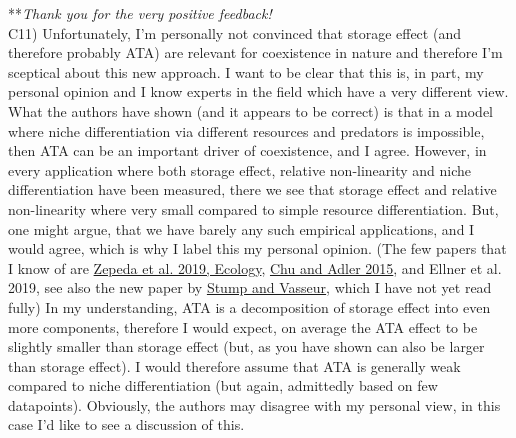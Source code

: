 \documentclass[letterpaper,11pt]{article}
\begin{document}
\noindent ***\emph{Thank you for the very positive feedback!} \\

\noindent C11) Unfortunately, I’m personally not convinced that storage effect (and therefore probably ATA) are relevant for coexistence in nature and therefore I’m sceptical about this new approach. I want to be clear that this is, in part, my personal opinion and I know experts in the field which have a very different view. What the authors have shown (and it appears to be correct) is that in a model where niche differentiation via different resources and predators is impossible, then ATA can be an important driver of coexistence, and I agree. However, in every application where both storage effect, relative non-linearity and niche differentiation have been measured, there we see that storage effect and relative non-linearity where very small compared to simple resource differentiation. But, one might argue, that we have barely any such empirical applications, and I would agree, which is why I label this my personal opinion. (The few papers that I know of are \href{https://nam10.safelinks.protection.outlook.com/?url=https%3A%2F%2Fdoi.org%2F10.1002%2Fecy.2726&data=05%7C01%7Cd294r143%40ku.edu%7C13ab816eaf2a49c27ea808db784a67cf%7C3c176536afe643f5b96636feabbe3c1a%7C0%7C0%7C638236033192197676%7CUnknown%7CTWFpbGZsb3d8eyJWIjoiMC4wLjAwMDAiLCJQIjoiV2luMzIiLCJBTiI6Ik1haWwiLCJXVCI6Mn0%3D%7C3000%7C%7C%7C&sdata=HbUTjzCNQrvGSARY5u3Eqme88DbKiNyiAVNOUGzjcbE%3D&reserved=0}{Zepeda et al. 2019, Ecology}, \href{https://nam10.safelinks.protection.outlook.com/?url=https%3A%2F%2Fdoi.org%2F10.1890%2F14-1741.1&data=05%7C01%7Cd294r143%40ku.edu%7C13ab816eaf2a49c27ea808db784a67cf%7C3c176536afe643f5b96636feabbe3c1a%7C0%7C0%7C638236033192197676%7CUnknown%7CTWFpbGZsb3d8eyJWIjoiMC4wLjAwMDAiLCJQIjoiV2luMzIiLCJBTiI6Ik1haWwiLCJXVCI6Mn0%3D%7C3000%7C%7C%7C&sdata=KKIBuLjBN2vNGWfEpduAGGrMAt7ov9a4F53CmlZQlO0%3D&reserved=0}{Chu and Adler 2015}, and Ellner et al. 2019, see also the new paper by \href{https://nam10.safelinks.protection.outlook.com/?url=https%3A%2F%2Fesajournals.onlinelibrary.wiley.com%2Fdoi%2Fepdf%2F10.1002%2Fecm.1585&data=05%7C01%7Cd294r143%40ku.edu%7C13ab816eaf2a49c27ea808db784a67cf%7C3c176536afe643f5b96636feabbe3c1a%7C0%7C0%7C638236033192197676%7CUnknown%7CTWFpbGZsb3d8eyJWIjoiMC4wLjAwMDAiLCJQIjoiV2luMzIiLCJBTiI6Ik1haWwiLCJXVCI6Mn0%3D%7C3000%7C%7C%7C&sdata=YaqsZ6axu6rYV12kh9IiRIbES7ZUMWIN7HXgB08iPzc%3D&reserved=0}{Stump and Vasseur}, which I have not yet read fully) In my understanding, ATA is a decomposition of storage effect into even more components, therefore I would expect, on average the ATA effect to be slightly smaller than storage effect (but, as you have shown can also be larger than storage effect). I would therefore assume that ATA is generally weak compared to niche differentiation (but again, admittedly based on few datapoints). Obviously, the authors may disagree with my personal view, in this case I’d like to see a discussion of this. \\
\end{document}
